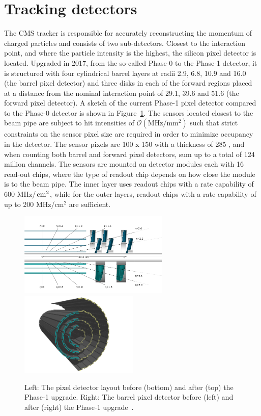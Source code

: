 \section{Tracking detectors}
The CMS tracker is responsible for accurately reconstructing the momentum of charged particles and consists of two sub-detectors. Closest to the interaction point, and where the particle intensity is the highest, the silicon pixel detector is located. Upgraded in 2017, from the so-called Phase-0 to the Phase-1 detector, it is structured with four cylindrical barrel layers at radii 2.9, 6.8, 10.9 and 16.0 \cm (the barrel pixel detector) and three disks in each of the forward regions placed at a distance from the nominal interaction point of 29.1, 39.6 and 51.6 \cm (the forward pixel detector). A sketch of the current Phase-1 pixel detector compared to the Phase-0 detector is shown in Figure~\ref{fig:cms:pixel}. The sensors located closest to the beam pipe are subject to hit intensities of $\mathcal{O}( \textrm{MHz}/\textrm{mm}^2 )$ such that strict constraints on the sensor pixel size are required in order to minimize occupancy in the detector. The sensor pixels are 100 \micron x 150 \micron with a thickness of 285 \micron, and when counting both barrel and forward pixel detectors, sum up to a total of 124 million channels. The sensors are mounted on detector modules each with 16 read-out chips, where the type of readout chip depends on how close the module is to the beam pipe. The inner layer uses readout chips with a rate capability of 600 MHz/$\,\text{cm}^2$, while for the outer layers, readout chips with a rate capability of up to 200 MHz/$\textrm{cm}^2$ are sufficient.
\begin{figure}[h] 
    \centering  
    \includegraphics[height=4cm,keepaspectratio]{figures/cms/20120828_01_pixel_phase1_largesharp.png}
    \includegraphics[height=4cm,keepaspectratio]{figures/cms/20120827_01_pixel_phase1_04.png}
    \caption{Left: The pixel detector layout before (bottom) and after (top) the Phase-1 upgrade. Right: The barrel pixel detector before (left) and after (right) the Phase-1 upgrade~\cite{Dominguez:1481838}.}
    \label{fig:cms:pixel}
\end{figure}
